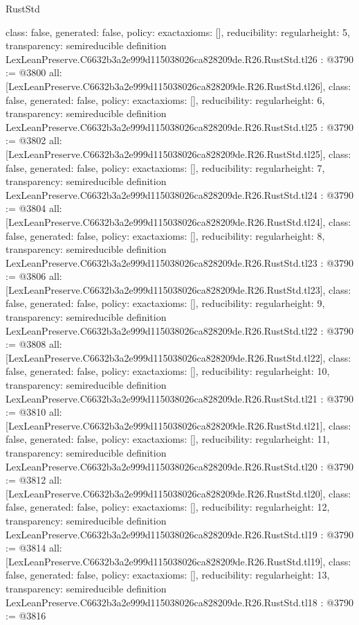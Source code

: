 \begin{lexlean}{RustStd}
\begin{coremodule}
{  class: false,
  generated: false,
  policy: exact{axioms: []},
  reducibility: regular{height: 5},
  transparency: semireducible
}
definition LexLeanPreserve.C6632b3a2e999d115038026ca828209de.R26.RustStd.tl26 : @3790 := @3800 {
  all: [LexLeanPreserve.C6632b3a2e999d115038026ca828209de.R26.RustStd.tl26],
  class: false,
  generated: false,
  policy: exact{axioms: []},
  reducibility: regular{height: 6},
  transparency: semireducible
}
definition LexLeanPreserve.C6632b3a2e999d115038026ca828209de.R26.RustStd.tl25 : @3790 := @3802 {
  all: [LexLeanPreserve.C6632b3a2e999d115038026ca828209de.R26.RustStd.tl25],
  class: false,
  generated: false,
  policy: exact{axioms: []},
  reducibility: regular{height: 7},
  transparency: semireducible
}
definition LexLeanPreserve.C6632b3a2e999d115038026ca828209de.R26.RustStd.tl24 : @3790 := @3804 {
  all: [LexLeanPreserve.C6632b3a2e999d115038026ca828209de.R26.RustStd.tl24],
  class: false,
  generated: false,
  policy: exact{axioms: []},
  reducibility: regular{height: 8},
  transparency: semireducible
}
definition LexLeanPreserve.C6632b3a2e999d115038026ca828209de.R26.RustStd.tl23 : @3790 := @3806 {
  all: [LexLeanPreserve.C6632b3a2e999d115038026ca828209de.R26.RustStd.tl23],
  class: false,
  generated: false,
  policy: exact{axioms: []},
  reducibility: regular{height: 9},
  transparency: semireducible
}
definition LexLeanPreserve.C6632b3a2e999d115038026ca828209de.R26.RustStd.tl22 : @3790 := @3808 {
  all: [LexLeanPreserve.C6632b3a2e999d115038026ca828209de.R26.RustStd.tl22],
  class: false,
  generated: false,
  policy: exact{axioms: []},
  reducibility: regular{height: 10},
  transparency: semireducible
}
definition LexLeanPreserve.C6632b3a2e999d115038026ca828209de.R26.RustStd.tl21 : @3790 := @3810 {
  all: [LexLeanPreserve.C6632b3a2e999d115038026ca828209de.R26.RustStd.tl21],
  class: false,
  generated: false,
  policy: exact{axioms: []},
  reducibility: regular{height: 11},
  transparency: semireducible
}
definition LexLeanPreserve.C6632b3a2e999d115038026ca828209de.R26.RustStd.tl20 : @3790 := @3812 {
  all: [LexLeanPreserve.C6632b3a2e999d115038026ca828209de.R26.RustStd.tl20],
  class: false,
  generated: false,
  policy: exact{axioms: []},
  reducibility: regular{height: 12},
  transparency: semireducible
}
definition LexLeanPreserve.C6632b3a2e999d115038026ca828209de.R26.RustStd.tl19 : @3790 := @3814 {
  all: [LexLeanPreserve.C6632b3a2e999d115038026ca828209de.R26.RustStd.tl19],
  class: false,
  generated: false,
  policy: exact{axioms: []},
  reducibility: regular{height: 13},
  transparency: semireducible
}
definition LexLeanPreserve.C6632b3a2e999d115038026ca828209de.R26.RustStd.tl18 : @3790 := @3816 {
}
\end{coremodule}
\end{lexlean}

